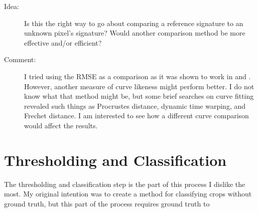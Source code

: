 \begin{description}
\item[Idea:] Is this the right way to go about comparing a reference signature to an unknown pixel’s signature? Would another comparison method be more effective and/or efficient?

\item[Comment:] I tried using the RMSE as a comparison as it was shown to work in \textcite{brown2007multitemporal} and \textcite{sakamoto2010a-two-step}. However, another measure of curve likeness might perform better. I do not know what that method might be, but some brief searches on curve fitting revealed such things as Procrustes distance, dynamic time warping, and Frechet distance. I am interested to see how a different curve comparison would affect the results.
\end{description}

\section{Thresholding and Classification}

The thresholding and classification step is the part of this process I dislike the most. My original intention was to create a method for classifying crops without ground truth, but this part of the process requires ground truth to 

